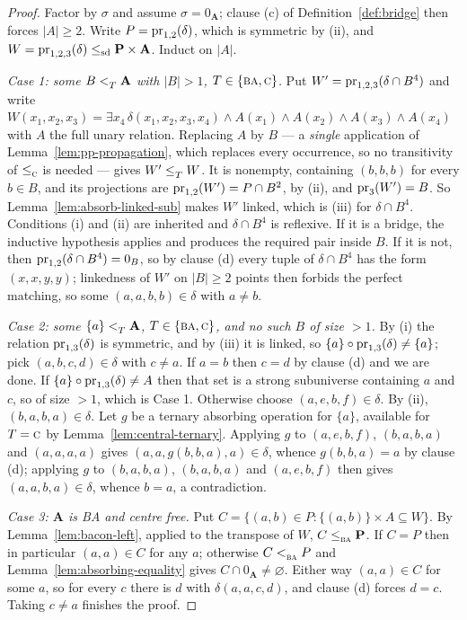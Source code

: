 \begin{proof}
Factor by $\sigma$ and assume $\sigma=0_{\mathbf A}$; clause (c) of
Definition~\ref{def:bridge} then forces $|A|\ge2$. Write
$P=\operatorname*{pr}_{1,2}(\delta)$, which is symmetric by (ii), and
$W=\operatorname*{pr}_{1,2,3}(\delta)\le_{\mathrm{sd}}\mathbf P\times\mathbf A$. Induct on $|A|$.

\emph{Case 1: some $B<_{T}^{}\mathbf A$ with $|B|>1$, $T\in\{\textup{\textsc{ba}},\textup{\textsc{c}}\}$.}
Put $W'=\operatorname*{pr}_{1,2,3}(\delta\cap B^{4})$ and write
$W(x_{1},x_{2},x_{3})=\exists x_{4}\,\delta(x_{1},x_{2},x_{3},x_{4})\wedge
A(x_{1})\wedge A(x_{2})\wedge A(x_{3})\wedge A(x_{4})$ with $A$ the full unary
relation. Replacing $A$ by $B$ --- a \emph{single} application of
Lemma~\ref{lem:pp-propagation}, which replaces every occurrence, so no
transitivity of $\le_{\textup{\textsc{c}}}^{}$ is needed --- gives $W'\le_{T}^{}W$. It is
nonempty, containing $(b,b,b)$ for every $b\in B$, and its projections are
$\operatorname*{pr}_{1,2}(W')=P\cap B^{2}$, by (ii), and $\operatorname*{pr}_{3}(W')=B$. So
Lemma~\ref{lem:absorb-linked-sub} makes $W'$ linked, which is (iii) for
$\delta\cap B^{4}$. Conditions (i) and (ii) are inherited and $\delta\cap B^{4}$
is reflexive. If it is a bridge, the inductive hypothesis applies and produces
the required pair inside $B$. If it is not, then $\operatorname*{pr}_{1,2}(\delta\cap
B^{4})=0_{B}$, so by clause (d) every tuple of $\delta\cap B^{4}$ has the form
$(x,x,y,y)$; linkedness of $W'$ on $|B|\ge2$ points then forbids the perfect
matching, so some $(a,a,b,b)\in\delta$ with $a\neq b$.

\emph{Case 2: some $\{a\}<_{T}^{}\mathbf A$, $T\in\{\textup{\textsc{ba}},\textup{\textsc{c}}\}$, and no such $B$
of size $>1$.} By (i) the relation $\operatorname*{pr}_{1,3}(\delta)$ is symmetric, and by
(iii) it is linked, so $\{a\}\circ\operatorname*{pr}_{1,3}(\delta)\neq\{a\}$; pick
$(a,b,c,d)\in\delta$ with $c\neq a$. If $a=b$ then $c=d$ by clause (d) and we
are done. If $\{a\}\circ\operatorname*{pr}_{1,3}(\delta)\neq A$ then that set is a strong
subuniverse containing $a$ and $c$, so of size $>1$, which is Case 1.
Otherwise choose $(a,e,b,f)\in\delta$. By (ii), $(b,a,b,a)\in\delta$. Let $g$
be a ternary absorbing operation for $\{a\}$, available for $T=\textup{\textsc{c}}$ by
Lemma~\ref{lem:central-ternary}. Applying $g$
to $(a,e,b,f)$, $(b,a,b,a)$ and $(a,a,a,a)$ gives $(a,a,g(b,b,a),a)\in\delta$,
whence $g(b,b,a)=a$ by clause (d); applying $g$ to $(b,a,b,a)$, $(b,a,b,a)$ and
$(a,e,b,f)$ then gives $(a,a,b,a)\in\delta$, whence $b=a$, a contradiction.

\emph{Case 3: $\mathbf A$ is BA and centre free.} Put
$C=\{(a,b)\in P:\{(a,b)\}\times A\subseteq W\}$. By
Lemma~\ref{lem:bacon-left}, applied to the transpose of $W$,
$C\le_{\textup{\textsc{ba}}}^{}\mathbf P$. If $C=P$ then in particular $(a,a)\in C$ for any $a$;
otherwise $C<_{\textup{\textsc{ba}}}^{}P$ and Lemma~\ref{lem:absorbing-equality} gives
$C\cap 0_{\mathbf A}\neq\varnothing$. Either way $(a,a)\in C$ for some $a$, so
for every $c$ there is $d$ with $\delta(a,a,c,d)$, and clause (d) forces $d=c$.
Taking $c\neq a$ finishes the proof.
\end{proof}


